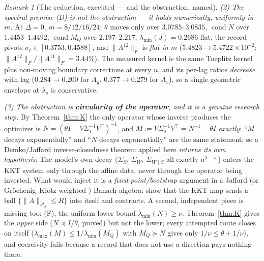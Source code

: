 \documentclass[11pt]{article}
\theoremstyle{definition}
\theoremstyle{remark}
\newtheorem{remark}{Remark}
\begin{document}
\begin{remark}[The reduction, executed --- and the obstruction, named]
\emph{(2) The spectral premise (D) is not the obstruction --- it
holds numerically, uniformly in $m$.} At $\Delta=0$, $m=8/12/16/24$:
$\theta$ moves only over $3.0785$--$3.0835$, $\operatorname{cond}N$
over $1.4453$--$1.4492$, $\operatorname{cond}M_Q$ over
$2.197$--$2.217$, $\lambda_{\min}(J)=0.2686$ flat, the record pivots
$\sigma_t\in[0.3753,0.4588]$, and $\|A^{12}\|_F$ is \emph{flat in $m$}
($5.4823\to5.4722\times10^{-2}$; $\|A^{12}\|_F/\|A^{11}\|_F=3.44\%$).
The measured kernel is the same Toeplitz kernel plus non-moving
boundary corrections at every $n$, and its per-lag ratios
\emph{decrease} with lag ($0.284\to0.200$ for $A_y$,
$0.377\to0.279$ for $A_v$), so a single geometric envelope at
$\lambda_s$ is conservative.

\emph{(3) The obstruction is \textbf{circularity of the operator}, and
it is a genuine research step.} By Theorem~\ref{thm:K} the only
operator whose inverse produces the optimizer is
$N=(\theta I+V\Sigma_s^{-1}V^{\!\top})^{-1}$, and
$M:=V\Sigma_s^{-1}V^{\!\top}=N^{-1}-\theta I$ \emph{exactly}: ``$M$
decays exponentially'' and ``$N$ decays exponentially'' are the same
statement, so a Demko/Jaffard inverse-closedness theorem
\cite{bib:dms84,bib:jaffard90} applied here
\emph{returns its own hypothesis}. The model's own decay ($\Sigma_S$,
$\Sigma_W$, $\Sigma_{W\mid S}$ all exactly $a^{|t-s|}$) enters the KKT
system only through the affine data, never through the operator being
inverted. What would inject it is a \emph{fixed-point/bootstrap}
argument in a Jaffard \cite{bib:jaffard90} (or Gr\"ochenig--Klotz
weighted \cite{bib:gk10}) Banach algebra:
show that the KKT map sends a ball
$\{\|A\|_{\mathcal A_\lambda}\le R\}$ into itself and contracts. A
second, independent piece is missing too: (F), the uniform lower bound
$\lambda_{\min}(N)\ge\nu$. Theorem~\ref{thm:K} gives the \emph{upper}
side ($N\preceq I/\theta$, proved) but not the lower; every attempted
route closes on itself ($\lambda_{\max}(M)\le1/\lambda_{\min}(M_Q)$
with $M_Q\succeq N$ gives only $1/\nu\le\theta+1/\nu$), and coercivity
fails because a record that does not use a direction pays nothing
there.


\end{remark}
\end{document}
